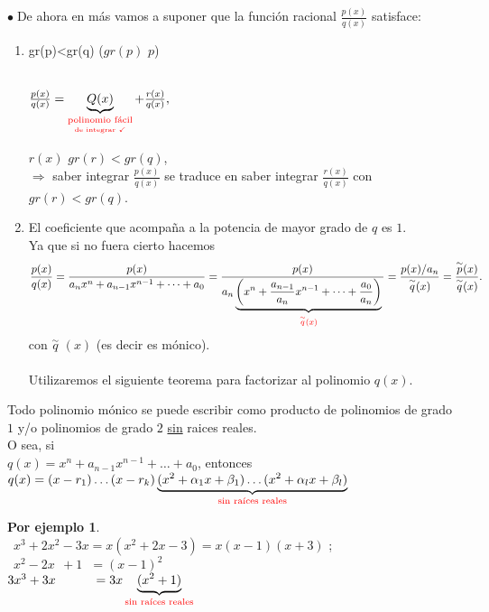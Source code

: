 \documentclass{article}
\theoremstyle{definition}
\newtheorem*{ej}{Por ejemplo}
\theoremstyle{remark}
\newcommand\bl{$\bullet\;$}
\newcommand\qtilde{\overset{\sim}{q}}
\begin{document}
\bl De ahora en más vamos a suponer que la función racional $\frac{p(x)}{q(x)}$ satisface:

\begin{enumerate}
  \item gr(p)<gr(q) \quad \quad \quad \big($gr(p)$  $p$\big) \\
  \\
\begin{center}
  $\frac{p(x)}{q(x)}=\underbrace{Q(x)}_{\textcolor{red}{\underset{\textcolor{red}{\text{de integrar $\checkmark$}}}{\textcolor{red}{\text{polinomio fácil}}}}}+\frac{r(x)}{q(x)},\quad$
\end{center}
   $r(x)$ \; \; $gr(r)<gr(q)$,\\
  $\Rightarrow$ saber integrar $\frac{p(x)}{q(x)}$ se traduce en saber integrar $\frac{r(x)}{q(x)}$ con $gr(r)<gr(q)$. \\
  \item El coeficiente que acompaña a la potencia de mayor grado de $q$ es $1$. \\
              Ya que si no fuera cierto hacemos
              \[
\frac{p(x)}{q(x)}=\frac{p(x)}{a_nx^n+a_{n-1}x^{n-1}+ \dots + a_0}=\frac{p(x)}{a_n\underbrace{\left(x^n+\frac{a_{n-1}}{a_n}x^{n-1}+\dots+\frac{a_0}{a_n}\right)}_{\textcolor{red}{\overset{\sim}{q}(x)}}{}}=\frac{p(x)/a_n}{\overset{\sim}{q}(x)}=\frac{\overset{\sim}{p}(x)}{\overset{\sim}{q}(x)}.
              \]
con $\qtilde$ $(x)$ (es decir es mónico).\\\\
Utilizaremos el siguiente teorema para factorizar al polinomio $q(x)$.
\end{enumerate} 
\pagebreak
\begin{teo}
  Todo polinomio mónico se puede escribir como producto de polinomios de grado $1$ y/o polinomios de grado $2$ \underline{sin} raices reales.\\
  O sea, si \\
  $q(x)=x^n+a_{n-1}x^{n-1}+\dots + a_0$, entonces \\
   $q(x)=(x-r_1)\dots(x-r_k)\underbrace{(x^2+\alpha_1x+\beta_1)\dots (x^2+\alpha_lx+\beta_l)}_{\text{\textcolor{red}{sin raíces reales}}}$
\end{teo}

\begin{ej} \; \\
  $\phantom{1}x^3+2x^2-3x=x(x^2+2x-3)=x(x-1)(x+3)$ ; \\
  $\phantom{1}x^2-2x\phantom{^x}+1\phantom{x}=(x-1)^2$ \\
  $3x^3+3x^{\phantom{x}}\phantom{-2xx}=3x\underbrace{(x^2+1)}_{\textcolor{red}{\text{sin raíces reales}}}$
\end{ej}
\end{document}
